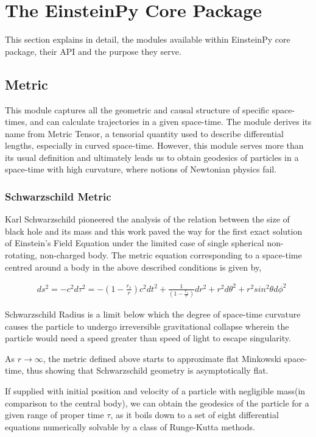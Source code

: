 \documentclass[refree]{aa}
\begin{document}
\section{The EinsteinPy Core Package} 
This section explains in detail, the modules available within EinsteinPy core package, their API and the purpose they serve.
\subsection{Metric}
This module captures all the geometric and causal structure of specific space-times, and can calculate trajectories in a given space-time. 
The module derives its name from Metric Tensor, a tensorial quantity used to describe differential lengths, especially in curved space-time. 
However, this module serves more than its usual definition and ultimately leads us to obtain geodesics of particles in a space-time with high curvature, where notions of Newtonian physics fail.
\subsubsection{Schwarzschild Metric} 
Karl Schwarzschild pioneered the analysis of the relation between the size of black hole and its mass and this work paved the way for the first exact solution of Einstein's Field Equation under the limited case of single spherical non-rotating, non-charged body. 
The metric equation \citep{Schwarzschild:1916uq} corresponding to a space-time centred around a body in the above described conditions is given by,

\begin{align}
& ds^2 = -c^2 d\tau ^2 = - (1 - \frac{r_s}{r})c^2 dt^2  + \frac{1}{(1 - \frac{r_s}{r})}dr^2 + r^2 d\theta ^2 + r^2 sin^2 \theta d\phi ^2
\end{align}

Schwarzschild Radius is a limit below which the degree of space-time curvature causes the particle to undergo irreversible gravitational collapse wherein the particle would need a speed greater than speed of light to escape singularity.

As $r \to \infty$, the metric defined above starts to approximate flat Minkowski space-time, thus showing that Schwarzschild geometry is asymptotically flat. 

If supplied with initial position and velocity of a particle with negligible mass(in comparison to the central body), we can obtain the geodesics of the particle for a given range of proper time $\tau$, as it boils down to a set of eight differential equations numerically solvable by a class of Runge-Kutta methods.
\end{document}
